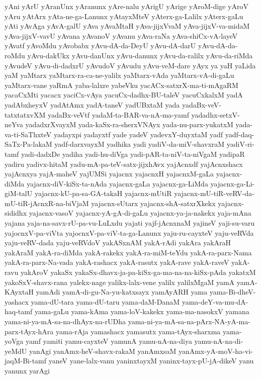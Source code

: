 {yAni
yArU
yAranUnx
yAranunx
yAre-nalu
yArigU
yArige
yAroM-dige
yAroV
yAru
yAtArx
yAta-ne-ga-Lanunx
yAtayxMteV
yAterx-ga-Lalilx
yAterx-gaLu
yAti
yAvAga
yAvA-galU
yAva
yAvaMtaH
yAva-jijxVvaM
yAva-jijxV-va-midaM
yAva-jijxV-vavU
yAvana
yAvanoV
yAvanu
yAva-raNa
yAva-shiCx-vA-layeV
yAvatf
yAvoMdu
yAvobabx
yAvu-dA-da-DeyU
yAvu-dA-darU
yAvu-dA-da-roMdu
yAvu-dakUkx
yAvu-danUnx
yAvu-danunx
yAvu-da-ralilx
yAvu-da-riMda
yAvudeV
yAvu-di-dadxrU
yAvudoV
yAvudu
yAvu-veM-dare
yAyx
ya
yaH
yaLida
yaM
yaMtarx
yaMtarx-ra-ca-ne-yalilx
yaMtarx-vAda
yaMtarx-vA-di-gaLu
yaMtarx-vane
yaRmA
yaba-lalxre
yabeVku
yacACx-satxrX-ma-ti-mAgaRM
yacaCxMti
yacacx
yaciCx-vAya
yacuCx-dadhx-BU-taleV
yacuCxkalxM
yadA
yadAbxheyxV
yadAtAmx
yadA-taneV
yadUBxtaM
yada
yadaBx-veV-tatxtatxvXM
yadaBx-veVtf
yadaM-ta-BAR-va-nA-ma-yamf
yadadhx-setxV-neYva
yadadxrXvayxM
yada-kaSx-ra-sherxVNAyx
yada-nu-parx-yukatxM
yada-va-ti-SaThxteV
yadayxpi
yadayxtf
yade
yadeV
yadevxY-duyxtaM
yadf
yadf-daq-SaTx-Pa-lakaM
yadf-darxvayxM
yadhika
yadi
yadiV-da-miV-shavxraM
yadiV-ri-tamf
yadi-dadxDe
yadiha
yadi-hu-diVga
yadi-pAR-ta-niV-ta-niVgaM
yadipaR
yadiru
yadivx-hitaM
yadu-mA-pa-teV-satx-jijxhAvx
yajAcnxdf
yajAcnxshacx
yajAcnxya
yajA-maheV
yajUMSi
yajacnx
yajacnxH
yajacnxM-gaLa
yajacnx-diMda
yajacnx-diV-kiSx-ta-nAda
yajacnx-gaLa
yajacnx-ga-LiMda
yajacnx-ga-Li-giM-talU
yajacnx-kU-pa-sa-GA-takaH
yajacnx-mUtiR
yajacnx-mU-tiR-veRV-da-mU-tiR-jAcnxR-na-biVjaM
yajacnx-sUtarx
yajacnx-shA-satxrXkekx
yajacnx-sididhx
yajacnx-vasoV
yajacnx-yA-gA-di-gaLu
yajacnx-ya-ja-nakekx
yaja-mAna
yajana
yaja-na-savx-rU-pa-vu-LuLxdu
yajati
yajf-jAcnxnaM
yajineV
yaji-su-varu
yajocnxV-pa-viVta
yajocnxV-pa-viV-ta-ga-Lanunx
yaju-ru-cayxteV
yaju-veRVda
yaju-veRV-dada
yaju-veRVdoV
yakASxnAM
yakA-rAdi
yakAra
yakAraH
yakAraM
yakA-ra-diMda
yakA-rakekx
yakA-ra-miM-teYdu
yakA-ra-parx-Nama
yakA-ra-parx-Na-vada
yakA-rashacx
yakA-rasutx
yakA-rave
yakA-raveV
yakA-ravu
yakAroV
yakaSx
yakaSx-dhavx-ja-pa-kiSx-ga-ma-na-na-kiSx-pAda
yakatxM
yakoSxV-shavx-rana
yalekx-nage
yalikx-lalx-vene
yalilx
yalilxMgaM
yamA
yamA-KAyxtaH
yamAdi
yamA-di-gu-Na-yu-katxsayx
yamAyARH
yama
yama-Bi-dheV-yashacx
yama-dU-tara
yama-dU-taru
yama-daM-DanaM
yama-deY-va-mu-dA-haq-tamf
yama-gaLu
yama-kAma
yama-loV-kakekx
yama-ma-nasokxV
yamana
yama-ni-ya-mA-sa-na-dhAyx-na-rUDha
yama-ni-ya-mA-sa-na-pArx-NA-yA-ma-parx-tAyx-hAra
yama-rAja
yamashacx
yamasutx
yama-tAyx-sharxma
yama-yoVga
yamf
yamiti
yamu-cayxteV
yamunA
yamu-nA-na-diya
yamu-nA-na-di-yeMdU
yanAgi
yanAmx-heV-shavx-rakaM
yanAmxsaM
yanAmx-yA-moV-ha-vi-jaqM-Bi-tamf
yaneV
yane-lalx-vanu
yaninxtayxM
yaninx-tayx-pU-jA-dikeV
yanu
yanunx
yarAgi
}
